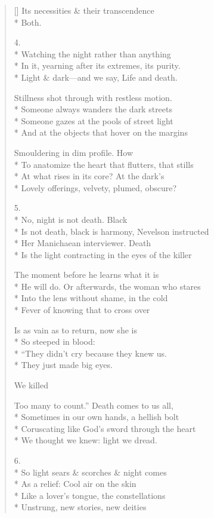\begin{verse}[\versewidth]
Its necessities \& their transcendence\\*
Both.

4.\\*
         Watching the night rather than anything\\*
In it, yearning after its extremes, its purity.\\*
Light \& dark---and we say, Life and death.

Stillness shot through with restless motion.\\*
Someone always wanders the dark streets\\*
Someone gazes at the pools of street light\\*
And at the objects that hover on the margins

Smouldering in dim profile. How\\*
To anatomize the heart that flutters, that stills\\*
At what rises in its core? At the dark's\\*
Lovely offerings, velvety, plumed, obscure?

5.\\*
No, night is not death. Black\\*
Is not death, black is harmony, Nevelson instructed \\*
Her Manichaean interviewer. Death\\*
Is the light contracting in the eyes of the killer

The moment before he learns what it is\\*
He will do. Or afterwards, the woman who stares\\*
Into the lens without shame, in the cold\\*
Fever of knowing that to cross over

Is as vain as to return, now she is\\*
So steeped in blood:\\*
``They didn't cry because they knew us.\\*
They just made big eyes.

We killed

Too many to count.'' Death comes to us all,\\*
Sometimes in our own hands, a hellish bolt\\*
Coruscating like God's sword through the heart\\*
We thought we knew: light we dread.

6.\\*
So light sears \& scorches \& night comes\\*
As a relief: Cool air on the skin\\*
Like a lover's tongue, the constellations\\*
Unstrung, new stories, new deities


\end{verse}

